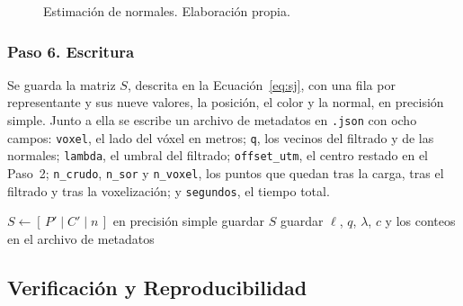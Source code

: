 \begin{figure}[!htbp]
\centering{}
\caption[Estimación de normales]{Estimación de normales. Elaboración propia.}
\end{figure}

\FloatBarrier
\subsubsection*{Paso 6. Escritura}
\label{sec:u1-p6}

Se guarda la matriz $S$, descrita en la Ecuación~\ref{eq:sj}, con una fila por
representante y sus nueve valores, la posición, el color y la normal, en
precisión simple. Junto a ella se escribe un archivo de metadatos en
\texttt{.json} con ocho campos: \texttt{voxel}, el lado del vóxel en metros;
\texttt{q}, los vecinos del filtrado y de las normales; \texttt{lambda}, el
umbral del filtrado; \texttt{offset\_utm}, el centro restado en el Paso~2;
\texttt{n\_crudo}, \texttt{n\_sor} y \texttt{n\_voxel}, los puntos que quedan
tras la carga, tras el filtrado y tras la voxelización; y \texttt{segundos}, el
tiempo total.

\begin{algorithm}[H]
\small
\caption{Paso 6 del Módulo~1, escritura.}
$S \leftarrow [\,P' \mid C' \mid n\,]$ en precisión simple\;
guardar $S$\;
guardar $\ell$, $q$, $\lambda$, $c$ y los conteos en el archivo de metadatos\;
\end{algorithm}

\FloatBarrier
\subsection{Verificación y Reproducibilidad}
\label{sec:u1-reproducibilidad}

